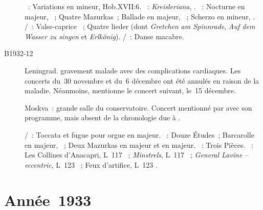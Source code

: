 \begin{description}
 \textsc{\Haydn{}}~: Variations en \kF mineur, Hob.XVII:6.
 \textsc{\Schumann{}}~: \emph{Kreisleriana}, .
 \textsc{\Chopin{}}~: Nocturne en \kF majeur,  ~; Quatre
 Mazurkas~; Ballade en \kA \Flat majeur, ~; Scherzo en \kC \Sharp
 mineur, .
 \textsc{\Schubert{}/\Liszt{}}~: Valse-caprice ~; Quatre lieder
 (dont \emph{Gretchen am Spinnrade}, \emph{Auf dem Wasser zu singen} et
 \emph{Erlkönig}).
 \textsc{\SaintSaens{}/\Liszt{}}~: Danse macabre.
 \item[B1932-12]
 Leningrad.
 \VSofronitsky{} gravement malade avec des complications cardiaques.
 Les concerts du~30 novembre et du~6 décembre ont été annulés en raison de
 la maladie.
 Néanmoins, \citet[p.~155]{Nekrasova08} mentionne le concert suivant, le~15
 décembre.
 \item[\DateWithWeekDay{1932-12-15}]
 Moskva~: grande salle du conservatoire.
 Concert mentionné par \citet[p.~155]{Nekrasova08} avec son programme, mais
 absent de la chronologie due à \citet[p.~405]{Scriabine}.

 \textsc{\JBach{}/\Busoni{}}~: Toccata et fugue pour orgue en \kC majeur.
 \textsc{\Chopin{}}~: Douze Études~; Barcarolle en \kF \Sharp majeur,
 ~; Deux Mazurkas en \kD majeur et en \kB majeur.
 \textsc{\Prokofiev{}}~: Trois Pièces.
 \textsc{\Debussy{}}~: Les Collines d'\hbox{Anacapri}, L~117 ~;
 \emph{Minstrels}, L~117 ~; \emph{General Lavine -- eccentric},
 L~123 ~; Feux d'artifice, L~123 .
\end{description}

\section{Année~1933}

